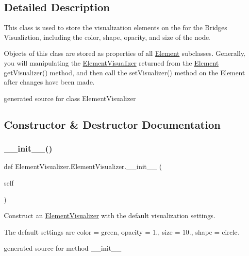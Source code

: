 \subsection{Detailed Description}
This class is used to store the visualization elements on the for the Bridges Visualiztion, including the color, shape, opacity, and size of the node. 

Objects of this class are stored as properties of all \hyperlink{namespace_element}{Element} subclasses. Generally, you will manipulating the \hyperlink{class_element_visualizer_1_1_element_visualizer}{Element\+Visualizer} returned from the \hyperlink{namespace_element}{Element} get\+Visualizer() method, and then call the set\+Visualizer() method on the \hyperlink{namespace_element}{Element} after changes have been made.\begin{DoxyVerb}generated source for class ElementVisualizer \end{DoxyVerb}
 

\subsection{Constructor \& Destructor Documentation}
\hypertarget{class_element_visualizer_1_1_element_visualizer_af8cdc78a3e01aeb46c3f0a6f18313267}{}\label{class_element_visualizer_1_1_element_visualizer_af8cdc78a3e01aeb46c3f0a6f18313267} 
\subsubsection{\texorpdfstring{\+\_\+\+\_\+init\+\_\+\+\_\+()}{\_\_init\_\_()}}
{\footnotesize\ttfamily def Element\+Visualizer.\+Element\+Visualizer.\+\_\+\+\_\+init\+\_\+\+\_\+ (\begin{DoxyParamCaption}\item[{}]{self }\end{DoxyParamCaption})}



Construct an \hyperlink{class_element_visualizer_1_1_element_visualizer}{Element\+Visualizer} with the default visualization settings. 

The default settings are color = green, opacity = 1., size = 10., shape = circle.\begin{DoxyVerb}generated source for method __init__ \end{DoxyVerb}
 

